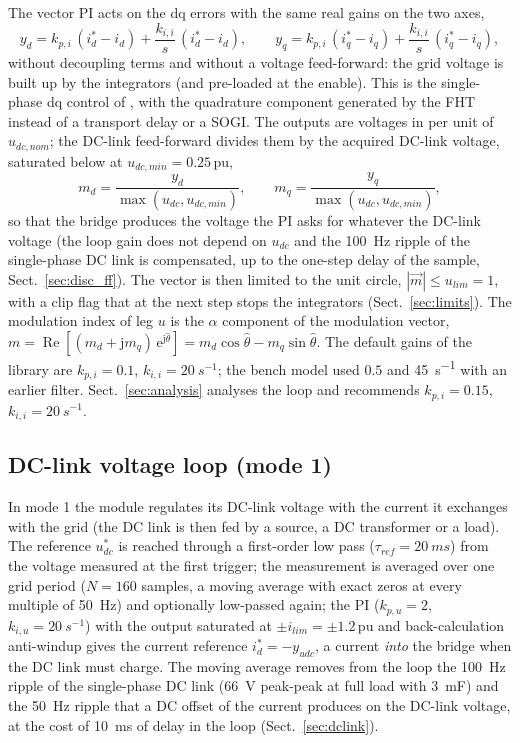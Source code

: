 \documentclass[10pt,a4paper]{scrartcl}
\newcommand{\kpi}{k_{p,i}}
\newcommand{\kii}{k_{i,i}}
\newcommand{\kpu}{k_{p,u}}
\newcommand{\kiu}{k_{i,u}}
\newcommand{\jj}{\mathrm{j}}
\newcommand{\ee}{\mathrm{e}}
\newcommand{\pu}{\,\mathrm{pu}}
\renewcommand{\Re}{\operatorname{Re}}
\begin{document}
\begin{onehalfspace}
The vector PI acts on the dq errors with the same real gains on the two axes,
\begin{equation}
y_d = \kpi\,(i_d^* - i_d) + \frac{\kii}{s}\,(i_d^* - i_d), \qquad y_q = \kpi\,(i_q^* - i_q) + \frac{\kii}{s}\,(i_q^* - i_q),
\label{eq:pi}
\end{equation}
without decoupling terms and without a voltage feed-forward: the grid voltage is built up by the integrators (and pre-loaded at the enable). This is the single-phase dq control of \cite{zhang2002}, with the quadrature component generated by the FHT instead of a transport delay or a SOGI. The outputs are voltages in per unit of $u_{dc,nom}$; the DC-link feed-forward divides them by the acquired DC-link voltage, saturated below at $u_{dc,min} = 0.25\pu$,
\begin{equation}
m_d = \frac{y_d}{\max(u_{dc}, u_{dc,min})}, \qquad m_q = \frac{y_q}{\max(u_{dc}, u_{dc,min})},
\label{eq:ff}
\end{equation}
so that the bridge produces the voltage the PI asks for whatever the DC-link voltage (the loop gain does not depend on $u_{dc}$ and the \SI{100}{Hz} ripple of the single-phase DC link is compensated, up to the one-step delay of the sample, Sect.~\ref{sec:disc_ff}). The vector is then limited to the unit circle, $|\vec m| \le u_{lim} = 1$, with a clip flag that at the next step stops the integrators (Sect.~\ref{sec:limits}). The modulation index of leg $u$ is the $\alpha$ component of the modulation vector, $m = \Re[(m_d + \jj m_q)\,\ee^{\jj\hat\theta}] = m_d\cos\hat\theta - m_q\sin\hat\theta$. The default gains of the library are $\kpi = 0.1$, $\kii = \SI{20}{s^{-1}}$; the bench model used $0.5$ and \SI{45}{s^{-1}} with an earlier filter. Sect.~\ref{sec:analysis} analyses the loop and recommends $\kpi = 0.15$, $\kii = \SI{20}{s^{-1}}$.

\subsection{DC-link voltage loop (mode 1)}
\label{sec:dclinkstructure}

In mode 1 the module regulates its DC-link voltage with the current it exchanges with the grid (the DC link is then fed by a source, a DC transformer or a load). The reference $u_{dc}^*$ is reached through a first-order low pass ($\tau_{ref} = \SI{20}{ms}$) from the voltage measured at the first trigger; the measurement is averaged over one grid period ($N = 160$ samples, a moving average with exact zeros at every multiple of \SI{50}{Hz}) and optionally low-passed again; the PI ($\kpu = 2$, $\kiu = \SI{20}{s^{-1}}$) with the output saturated at $\pm i_{lim} = \pm 1.2\pu$ and back-calculation anti-windup gives the current reference $i_d^* = -y_{udc}$, a current \emph{into} the bridge when the DC link must charge. The moving average removes from the loop the \SI{100}{Hz} ripple of the single-phase DC link (\SI{66}{V} peak-peak at full load with \SI{3}{mF}) and the \SI{50}{Hz} ripple that a DC offset of the current produces on the DC-link voltage, at the cost of \SI{10}{ms} of delay in the loop (Sect.~\ref{sec:dclink}).


\end{onehalfspace}
\end{document}
